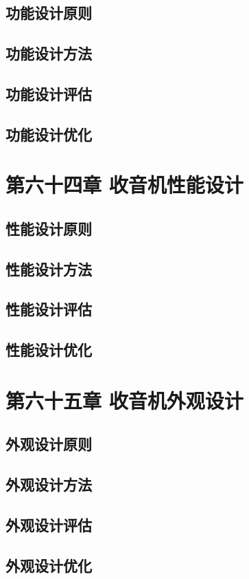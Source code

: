 \documentclass[12pt,UTF8]{ctexbook}
\begin{document}
\section{功能设计原则}
\section{功能设计方法}
\section{功能设计评估}
\section{功能设计优化}

\chapter{第六十四章 收音机性能设计}

\section{性能设计原则}
\section{性能设计方法}
\section{性能设计评估}
\section{性能设计优化}

\chapter{第六十五章 收音机外观设计}

\section{外观设计原则}
\section{外观设计方法}
\section{外观设计评估}
\section{外观设计优化}
\end{document}
